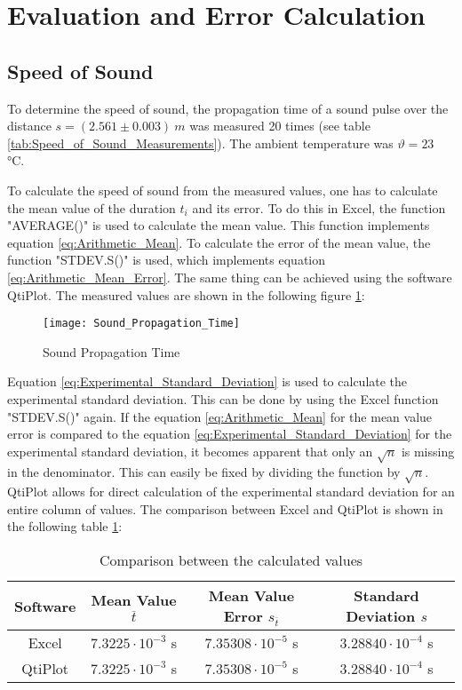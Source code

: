 \section{Evaluation and Error Calculation}
\label{sec:Evaluation}
\subsection{Speed of Sound}
\label{subsec:Speed_of_Sound}
To determine the speed of sound, the propagation time of a sound pulse over the distance $s=(2.561\pm0.003)\ m$ was measured 20 times (see table \ref{tab:Speed_of_Sound_Measurements}). The ambient temperature was $\vartheta=23$ °C.

To calculate the speed of sound from the measured values, one has to calculate the mean value of the duration $t_i$ and its error. To do this in Excel, the function "AVERAGE()" is used to calculate the mean value. This function implements equation \ref{eq:Arithmetic_Mean}. To calculate the error of the mean value, the function "STDEV.S()" is used, which implements equation \ref{eq:Arithmetic_Mean_Error}. The same thing can be achieved using the software QtiPlot. The measured values are shown in the following figure \ref{fig:Sound_Propagation_Time}:
\begin{figure}[H]
	\centering
	\texttt{[image: Sound\_Propagation\_Time]}
	\caption{Sound Propagation Time}
	\label{fig:Sound_Propagation_Time}
\end{figure}
Equation \ref{eq:Experimental_Standard_Deviation} is used to calculate the experimental standard deviation. This can be done by using the Excel function "STDEV.S()" again. If the equation \ref{eq:Arithmetic_Mean} for the mean value error is compared to the equation \ref{eq:Experimental_Standard_Deviation} for the experimental standard deviation, it becomes apparent that only an $\sqrt{n}$ is missing in the denominator. This can easily be fixed by dividing the function by $\sqrt{n}$. QtiPlot allows for direct calculation of the experimental standard deviation for an entire column of values.
\newpage
The comparison between Excel and QtiPlot is shown in the following table \ref{tab:Comparison_Speed_of_Sound_Measurements}:
\begin{table}[H]
	\centering
	\renewcommand{\arraystretch}{1.2}
	\begin{tabular}{c c c c}
		\hline
		\textbf{Software} & \textbf{Mean Value $\overline t$} & \textbf{Mean Value Error $s_{\overline{t}}$} & \textbf{Standard Deviation $s$} \\
		\hline
		Excel & $7.3225\cdot10^{-3}$ s & $7.35308\cdot10^{-5}$ s & $3.28840\cdot10^{-4}$ s \\
		QtiPlot & $7.3225\cdot10^{-3}$ s & $7.35308\cdot10^{-5}$ s & $3.28840\cdot10^{-4}$ s \\ \hline
	\end{tabular}
	\caption{Comparison between the calculated values}
	\label{tab:Comparison_Speed_of_Sound_Measurements}
\end{table}
